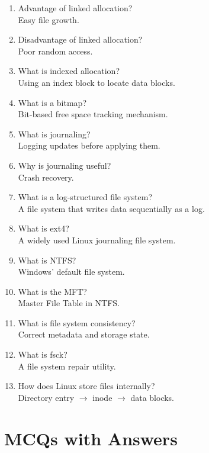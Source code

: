 \begin{enumerate}
\item Advantage of linked allocation?\\
Easy file growth.

\item Disadvantage of linked allocation?\\
Poor random access.

\item What is indexed allocation?\\
Using an index block to locate data blocks.

\item What is a bitmap?\\
Bit-based free space tracking mechanism.

\item What is journaling?\\
Logging updates before applying them.

\item Why is journaling useful?\\
Crash recovery.

\item What is a log-structured file system?\\
A file system that writes data sequentially as a log.

\item What is ext4?\\
A widely used Linux journaling file system.

\item What is NTFS?\\
Windows' default file system.

\item What is the MFT?\\
Master File Table in NTFS.

\item What is file system consistency?\\
Correct metadata and storage state.

\item What is fsck?\\
A file system repair utility.

\item How does Linux store files internally?\\
Directory entry $\rightarrow$ inode $\rightarrow$ data blocks.
\end{enumerate}

\section{MCQs with Answers}

